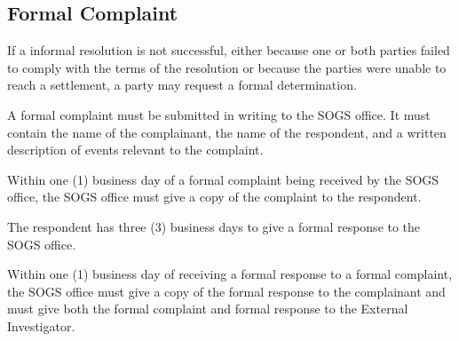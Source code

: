 \subsection{Formal Complaint}
\begin{longenum}[ label*=\thesubsection.\arabic*., align=left]
	\item If a informal resolution is not successful, either because one or both parties failed to comply with the terms of the resolution or because the parties were unable to reach a settlement, a party may request a formal determination.
    \item A formal complaint must be submitted in writing to the SOGS office. It must contain the name of the complainant, the name of the respondent, and a written description of events relevant to the complaint. 
    \item Within one (1) business day of a formal complaint being received by the SOGS office, the SOGS office must give a copy of the complaint to the respondent.
    \item The respondent has three (3) business days to give a formal response to the SOGS office.
    \item Within one (1) business day of receiving a formal response to a formal complaint, the SOGS office must give a copy of the formal response to the complainant and must give both the formal complaint and formal response to the External Investigator.
\end{longenum}
